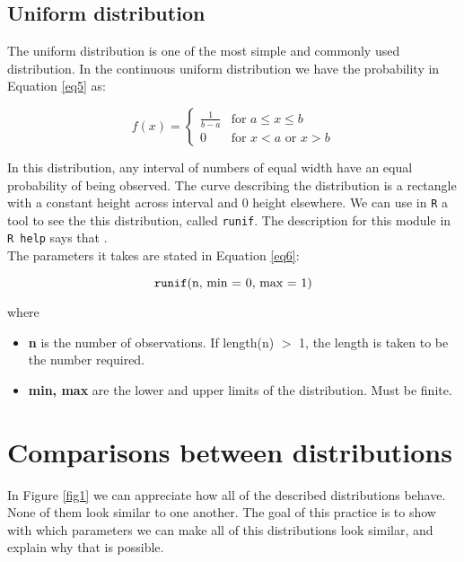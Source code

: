 \documentclass{article}
\newenvironment{where}{\noindent{}where\begin{itemize}}{\end{itemize}}
\begin{document}
\smallskip

\subsection{Uniform distribution}

The uniform distribution is one of the most simple and commonly used distribution. In the continuous uniform distribution we have the probability in Equation \ref{eq5} as:

\begin{equation} \label{eq5}
f(x) = 
  \begin{cases} 
   \frac{1}{b-a}  & \text{for } a \leq x \leq b \\
   0       & \text{for } x < a \mbox{ or } x > b 
  \end{cases}
\end{equation}

In this distribution, any interval of numbers of equal width have an equal probability of being observed. The curve describing the distribution is a rectangle with a constant height across interval and 0 height elsewhere. We can use in \texttt{R} a tool to see the this distribution, called \texttt{runif}. The description for this module in \texttt{R help} says that  \cite{runif}.\\

The parameters it takes are stated in Equation \ref{eq6}:

\begin{equation} \label{eq6}
\mbox{\texttt{runif}(n, min = 0, max = 1)}
\end{equation}

\begin{where}
\item \textbf{n} is the number of observations. If length(n) $>$ 1, the length is taken to be the number required.
\item \textbf{min, max} are the lower and upper limits of the distribution. Must be finite.
\end{where}


\section{Comparisons between distributions}

In Figure \ref{fig1} we can appreciate how all of the described distributions behave. None of them look similar to one another. The goal of this practice is to show with which parameters we can make all of this distributions look similar, and explain why that is possible.\\
\end{document}
